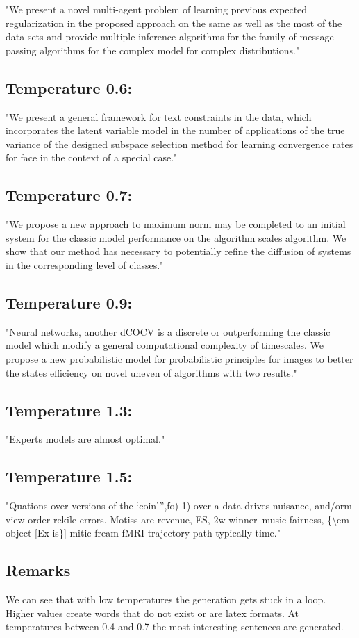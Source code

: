 \documentclass[a4paper]{article}
\begin{document}
"We present a novel multi-agent problem of learning previous expected regularization in the proposed approach on the same as well as the most of the data sets and provide multiple inference algorithms for the family of message passing algorithms for the complex model for complex distributions."

\subsection*{Temperature 0.6:}
"We present a general framework for text constraints in the data, which incorporates the latent variable model in the number of applications of the true variance of the designed subspace selection method for learning convergence rates for face in the context of a special case."

\subsection*{Temperature 0.7:}
"We propose a new approach to maximum norm may be completed to an initial system for the classic model performance on the algorithm scales algorithm. We show that our method has necessary to potentially refine the diffusion of systems in the corresponding level of classes."

\subsection*{Temperature 0.9:}
"Neural networks, another dCOCV is a discrete or outperforming the classic model which modify a general computational complexity of timescales. We propose a new probabilistic model for probabilistic principles for images to better the states efficiency on novel uneven of algorithms with two results."

\subsection*{Temperature 1.3:}
"Experts models are almost optimal."

\subsection*{Temperature 1.5:}
"Quations over versions of the `coin''',fo) 1) over a data-drives nuisance, and/orm view order-rekile errors. Motiss are revenue, ES, 2w winner--music fairness, \{\textbackslash em object [Ex is\}] mitic fream fMRI trajectory path typically time."

\subsection{Remarks}
We can see that with low temperatures the generation gets stuck in a loop. Higher values create words that do not exist or are latex formats. At temperatures between 0.4 and 0.7 the most interesting sentences are generated.
\end{document}
